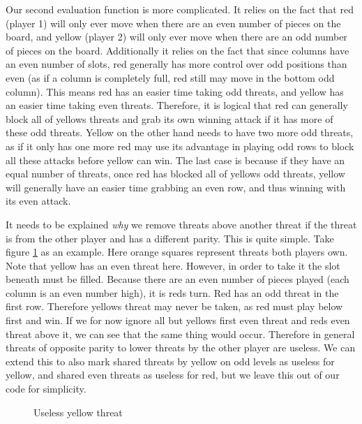 \documentclass{article}
\newcommand{\rd}{\node [player, fill=red]{};}
\newcommand{\yw}{\node [player, fill=yellow] {};}
\newcommand{\gy}{\node [player, fill=white] {};}
\newcommand{\bt}{\node [threat, fill=orange!50] {};}
\begin{document}
Our second evaluation function is more complicated. It relies on the fact that red (player 1) will only ever move when there are an even number of pieces on the board, and yellow (player 2) will only ever move when there are an odd number of pieces on the board. Additionally it relies on the fact that since columns have an even number of slots, red generally has more control over odd positions than even (as if a column is completely full, red still may move in the bottom odd column). This means red has an easier time taking odd threats, and yellow has an easier time taking even threats. Therefore, it is logical that red can generally block all of yellows threats and grab its own winning attack if it has more of these odd threats. Yellow on the other hand needs to have two more odd threats, as if it only has one more red may use its advantage in playing odd rows to block all these attacks before yellow can win. The last case is because if they have an equal number of threats, once red has blocked all of yellows odd threats, yellow will generally have an easier time grabbing an even row, and thus winning with its even attack.
		
It needs to be explained \emph{why} we remove threats above another threat if the threat is from the other player and has a different parity. This is quite simple. Take figure \ref{threatblock} as an example. Here orange squares represent threats both players own. Note that yellow has an even threat here. However, in order to take it the slot beneath must be filled. Because there are an even number of pieces played (each column is an even number high), it is reds turn. Red has an odd threat in the first row. Therefore yellows threat may never be taken, as red must play below first and win. If we for now ignore all but yellows first even threat and reds even threat above it, we can see that the same thing would occur. Therefore in general threats of opposite parity to lower threats by the other player are useless. We can extend this to also mark shared threats by yellow on odd levels as useless for yellow, and shared even threats as useless for red, but we leave this out of our code for simplicity.
		
\begin{figure}[t]
	\centering
	\caption{Useless yellow threat}
	\label{threatblock}
\end{figure}
\end{document}
